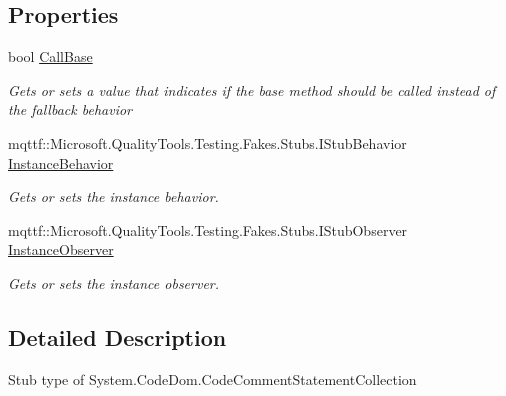 \subsection*{Properties}
\begin{DoxyCompactItemize}
\item 
bool \hyperlink{class_system_1_1_code_dom_1_1_fakes_1_1_stub_code_comment_statement_collection_a4f274388b4c8a55c162200bbff856843}{Call\-Base}
\begin{DoxyCompactList}\small\item\em Gets or sets a value that indicates if the base method should be called instead of the fallback behavior\end{DoxyCompactList}\item 
mqttf\-::\-Microsoft.\-Quality\-Tools.\-Testing.\-Fakes.\-Stubs.\-I\-Stub\-Behavior \hyperlink{class_system_1_1_code_dom_1_1_fakes_1_1_stub_code_comment_statement_collection_a3c4c4ed6fa7282d1620edd6f310224e7}{Instance\-Behavior}
\begin{DoxyCompactList}\small\item\em Gets or sets the instance behavior.\end{DoxyCompactList}\item 
mqttf\-::\-Microsoft.\-Quality\-Tools.\-Testing.\-Fakes.\-Stubs.\-I\-Stub\-Observer \hyperlink{class_system_1_1_code_dom_1_1_fakes_1_1_stub_code_comment_statement_collection_a9c551e8e04b9d87ae2aa4260891ebabc}{Instance\-Observer}
\begin{DoxyCompactList}\small\item\em Gets or sets the instance observer.\end{DoxyCompactList}\end{DoxyCompactItemize}


\subsection{Detailed Description}
Stub type of System.\-Code\-Dom.\-Code\-Comment\-Statement\-Collection



